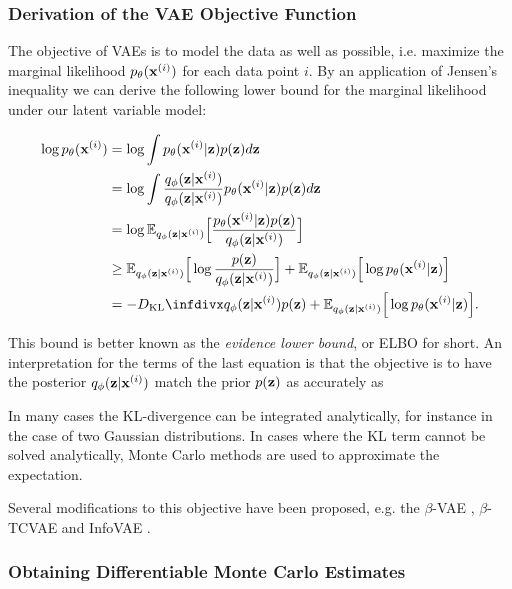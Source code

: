 \subsubsection{Derivation of the VAE Objective Function}

The objective of VAEs is to model the data as well as possible, i.e. maximize the marginal likelihood $p_{\mathbf{\theta}}(\mathbf{x}^{(i)})$ for each data point $i$. By an application of Jensen's inequality we can derive the following lower bound for the marginal likelihood under our latent variable model:

\begin{equation}
\begin{aligned}
\log \ptheta(\bxi) & = \log \int \ptheta(\bxi \vert \bz) p(\bz) d\bz \\
                   & = \log \int \frac{\qphi(\bz \vert \bxi)}{\qphi(\bz \vert \bxi)} \ptheta(\bxi \vert \bz) p(\bz) d\bz \\
                   & = \log \mathbb{E}_{\qphi(\bz \vert \bxi)}\Big[\frac{\ptheta(\bxi \vert \bz) p(\bz)}{\qphi(\bz \vert \bxi)}\Big] \\
                   & \geq \mathbb{E}_{\qphi(\bz \vert \bxi)}\Big[\log \frac{p(\bz)}{\qphi(\bz \vert \bxi)}\Big] + \mathbb{E}_{\qphi(\bz \vert \bxi)}\Big[\log \ptheta(\bxi \vert \bz)\Big] \\
                   & = -\dkl{\qphi(\bz \vert \bxi)}{p(\bz)} + \mathbb{E}_{\qphi(\bz \vert \bxi)}\Big[\log \ptheta(\bxi \vert \bz)\Big].
\end{aligned}
\end{equation}

This bound is better known as the \textit{evidence lower bound}, or ELBO for short. An interpretation for the terms of the last equation is that the objective is to have the posterior $q_{\mathbf{\phi}}(\mathbf{z} \vert \mathbf{x}^{(i)})$ match the prior $p(\mathbf{z})$ as accurately as 

In many cases the KL-divergence can be integrated analytically, for instance in the case of two Gaussian distributions. In cases where the KL term cannot be solved analytically, Monte Carlo methods are used to approximate the expectation.

Several modifications to this objective have been proposed, e.g. the $\beta$-VAE \cite{beta_vae, understanding_beta_vae}, $\beta$-TCVAE \cite{beta_tcvae} and InfoVAE \cite{infovae}.

\subsubsection{Obtaining Differentiable Monte Carlo Estimates}

